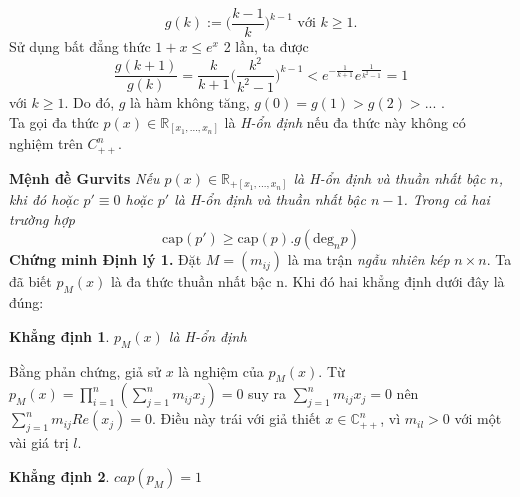 \documentclass[a4paper, 12pt]{report}
\newtheorem{claim}{Khẳng định}
\begin{document}
\begin{equation*}
	g(k) := \Big( \frac{k-1}{k} \Big)^{k-1}  \textrm{                   với    } k \geq 1.
\end{equation*}
Sử dụng bất đẳng thức $1 +x \leq e^x$ 2 lần, ta được
\begin{equation*}
	\frac{g(k+1)}{g(k)} = \frac{k}{k+1} \Big( \frac{k^2}{k^2 - 1}\Big) ^{k-1} < e^{-\frac{1}{k+1}}e^{\frac{1}{k^2 - 1}} =1
\end{equation*}
với $k \geq 1$. Do đó, $g$ là hàm không tăng, $g(0) = g(1) > g(2) > ...$ .\\
Ta gọi đa thức $p(x) \in \mathbb{R}_{[x_1,...,x_n]}$ là \textit{H-ổn định} nếu đa thức này không có nghiệm trên $C_{++}^{n}$.

\textbf{Mệnh đề Gurvits}
\textit{Nếu $p(x) \in \mathbb{R}_{+[x_1,...,x_n]}$ là H-ổn định và thuần nhất bậc $n$, khi đó hoặc $p' \equiv 0$ hoặc $p'$ là H-ổn định và thuần nhất bậc $n-1$. Trong cả hai trường hợp}
\begin{equation}
 \textrm{cap}(p') \geq \textrm{cap}(p).g(\textrm{deg}_{n}p) \label{Gurvits}
\end{equation}
\textbf{Chứng minh Định lý 1.}
Đặt $M=(m_{ij})$ là ma trận \textit{ngẫu nhiên kép} $n \times n$. Ta đã biết $p_M(x)$ là đa thức thuần nhất bậc n. Khi đó hai khẳng định dưới đây là đúng:
\begin{claim}
	$p_M(x)$ là H-ổn định
\end{claim}
Bằng phản chứng, giả sử $x$ là nghiệm của $p_M(x)$. Từ $p_M(x) = \prod_{i=1}^{n} (\sum_{j=1}^{n} m_{ij}x_{j}) =0$ suy ra $\sum_{j=1}^{n} m_{ij}x_{j} =0$ nên $\sum_{j=1}^{n} m_{ij}Re(x_{j}) =0$. Điều này trái với giả thiết $x \in \mathbb{C}^{n}_{++}$, vì $m_{il} > 0$ với một vài giá trị $l$. 
\begin{claim}
	$cap(p_M) =1$
\end{claim}
\end{document}
